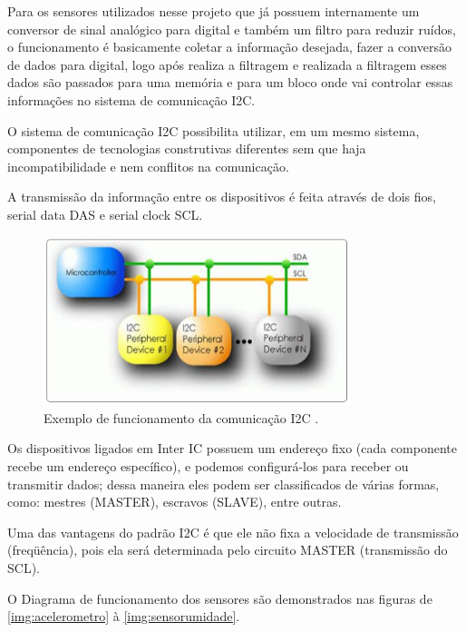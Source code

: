 Para os sensores utilizados nesse projeto que já possuem internamente um conversor de sinal analógico para digital e também um filtro para reduzir ruídos, o funcionamento é basicamente coletar a informação desejada, fazer a conversão de dados para digital, logo após realiza a filtragem e realizada a filtragem esses dados são passados para uma memória e para um bloco onde vai controlar essas informações no sistema de comunicação I2C.

O sistema de comunicação I2C possibilita utilizar, em um mesmo sistema, componentes de tecnologias construtivas diferentes sem que haja incompatibilidade e nem conflitos na comunicação.

A transmissão da informação entre os dispositivos é feita através de dois fios, serial data DAS e serial clock SCL.

\begin{figure}[H]
	\centering
	\includegraphics[width=0.8\textwidth]{figuras/1}
	\caption{Exemplo de funcionamento da comunicação I2C \cite{microcontrolandos}.}
	\label{img:funcionamentoI2c}
\end{figure}

Os dispositivos ligados em Inter IC possuem um endereço fixo (cada componente recebe um endereço específico), e podemos configurá-los para receber ou transmitir dados; dessa maneira eles podem ser classificados de várias formas, como: mestres (MASTER), escravos (SLAVE), entre outras.

Uma das vantagens do padrão I2C é que ele não fixa a velocidade de transmissão (freqüência), pois ela será determinada pelo circuito MASTER (transmissão do SCL).

O Diagrama de funcionamento dos sensores são demonstrados nas figuras de \ref{img:acelerometro} à \ref{img:sensorumidade}.

